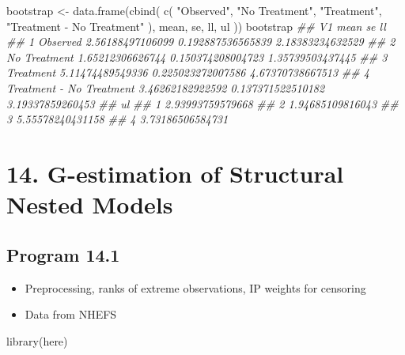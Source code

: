 \documentclass[
  10pt,
  a4paper,
]{book}
\newenvironment{Shaded}{\begin{snugshade}}{\end{snugshade}}
\newcommand{\DocumentationTok}[1]{\textcolor[rgb]{0.37,0.37,0.37}{\textit{#1}}}
\newcommand{\FunctionTok}[1]{\textcolor[rgb]{0.28,0.35,0.67}{#1}}
\newcommand{\NormalTok}[1]{\textcolor[rgb]{0.00,0.46,0.62}{#1}}
\newcommand{\OtherTok}[1]{\textcolor[rgb]{0.00,0.46,0.62}{#1}}
\newcommand{\StringTok}[1]{\textcolor[rgb]{0.13,0.47,0.30}{#1}}
\providecommand{\tightlist}{%
  \setlength{\itemsep}{0pt}\setlength{\parskip}{0pt}}
\begin{document}
\begin{Shaded}
\begin{Highlighting}[]
\NormalTok{bootstrap }\OtherTok{\textless{}{-}}
  \FunctionTok{data.frame}\NormalTok{(}\FunctionTok{cbind}\NormalTok{(}
    \FunctionTok{c}\NormalTok{(}
      \StringTok{"Observed"}\NormalTok{,}
      \StringTok{"No Treatment"}\NormalTok{,}
      \StringTok{"Treatment"}\NormalTok{,}
      \StringTok{"Treatment {-} No Treatment"}
\NormalTok{    ),}
\NormalTok{    mean,}
\NormalTok{    se,}
\NormalTok{    ll,}
\NormalTok{    ul}
\NormalTok{  ))}
\NormalTok{bootstrap}
\DocumentationTok{\#\#                         V1             mean                se               ll}
\DocumentationTok{\#\# 1                 Observed 2.56188497106099 0.192887536565839 2.18383234632529}
\DocumentationTok{\#\# 2             No Treatment 1.65212306626744 0.150374208004723 1.35739503437445}
\DocumentationTok{\#\# 3                Treatment 5.11474489549336 0.225023272007586 4.67370738667513}
\DocumentationTok{\#\# 4 Treatment {-} No Treatment 3.46262182922592 0.137371522510182 3.19337859260453}
\DocumentationTok{\#\#                 ul}
\DocumentationTok{\#\# 1 2.93993759579668}
\DocumentationTok{\#\# 2 1.94685109816043}
\DocumentationTok{\#\# 3 5.55578240431158}
\DocumentationTok{\#\# 4 3.73186506584731}
\end{Highlighting}
\end{Shaded}

\hypertarget{g-estimation-of-structural-nested-models}{%
\chapter*{14. G-estimation of Structural Nested Models}\label{g-estimation-of-structural-nested-models}}

\hypertarget{program-14.1}{%
\section{Program 14.1}\label{program-14.1}}

\begin{itemize}
\tightlist
\item
  Preprocessing, ranks of extreme observations, IP weights for censoring
\item
  Data from NHEFS
\end{itemize}

\begin{Shaded}
\begin{Highlighting}[]
\FunctionTok{library}\NormalTok{(here)}
\end{Highlighting}
\end{Shaded}
\end{document}
